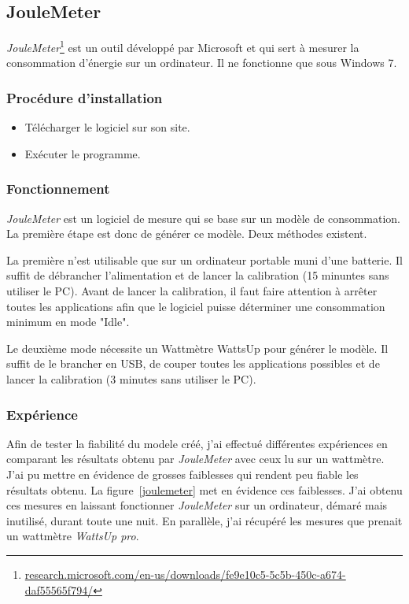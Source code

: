 \documentclass[a4paper, 11pt]{report}
\begin{document}
		\subsection{JouleMeter}
\textit{JouleMeter}\footnote{\href{http://research.microsoft.com/en-us/downloads/fe9e10c5-5c5b-450c-a674-daf55565f794/}{research.microsoft.com/en-us/downloads/fe9e10c5-5c5b-450c-a674-daf55565f794/}} est un outil développé par Microsoft et qui sert à mesurer la consommation d’énergie sur un ordinateur. Il ne fonctionne que sous Windows 7.

			\subsubsection{Procédure d'installation}
\begin{itemize}
	\item Télécharger le logiciel sur son site.
	\item Exécuter le programme.
\end{itemize}

			\subsubsection{Fonctionnement}
\textit{JouleMeter} est un logiciel de mesure qui se base sur un modèle de consommation. La première étape est donc de générer ce modèle. Deux méthodes existent.

La première n’est utilisable que sur un ordinateur portable muni d’une batterie. Il suffit de débrancher l’alimentation et de lancer la calibration (15 minuntes sans utiliser le PC). Avant de lancer la calibration, il faut faire attention à arrêter toutes les applications afin que le logiciel puisse déterminer une consommation minimum en mode "Idle".

Le deuxième mode nécessite un Wattmètre WattsUp pour générer le modèle. Il suffit de le brancher en USB, de couper toutes les applications possibles et de lancer la calibration (3 minutes sans utiliser le PC).

			\subsubsection{Expérience}
Afin de tester la fiabilité du modele créé, j'ai effectué différentes expériences en comparant les résultats obtenu par \textit{JouleMeter} avec ceux lu sur un wattmètre. J'ai pu mettre en évidence de grosses faiblesses qui rendent peu fiable les résultats obtenu. La figure~\ref{joulemeter} met en évidence ces faiblesses. J'ai obtenu ces mesures en laissant fonctionner \textit{JouleMeter} sur un ordinateur, démaré mais inutilisé, durant toute une nuit. En parallèle, j'ai récupéré les mesures que prenait un wattmètre \textit{WattsUp pro}.
\end{document}
